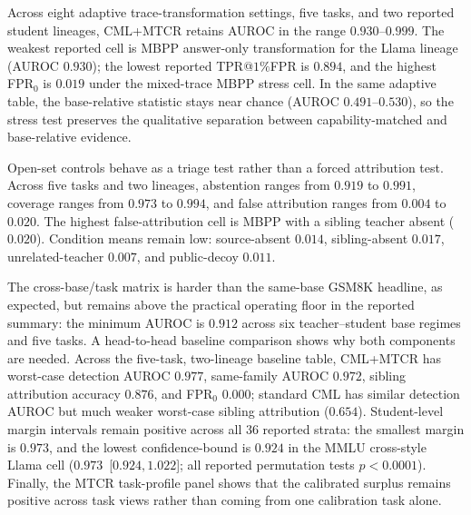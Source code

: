 \documentclass[journal]{IEEEtran}
\begin{document}
Across eight adaptive trace-transformation settings, five tasks, and two reported
student lineages, CML+MTCR retains AUROC in the range $0.930$--$0.999$. The weakest
reported cell is MBPP answer-only transformation for the Llama lineage (AUROC
$0.930$); the lowest reported TPR@$1\%$FPR is $0.894$, and the highest FPR$_0$ is
$0.019$ under the mixed-trace MBPP stress cell. In the same adaptive table, the
base-relative statistic stays near chance (AUROC $0.491$--$0.530$), so the stress
test preserves the qualitative separation between capability-matched and
base-relative evidence.

Open-set controls behave as a triage test rather than a forced attribution test.
Across five tasks and two lineages, abstention ranges from $0.919$ to $0.991$,
coverage ranges from $0.973$ to $0.994$, and false attribution ranges from $0.004$
to $0.020$. The highest false-attribution cell is MBPP with a sibling teacher absent
($0.020$). Condition means remain low: source-absent $0.014$, sibling-absent
$0.017$, unrelated-teacher $0.007$, and public-decoy $0.011$.

The cross-base/task matrix is harder than the same-base GSM8K headline, as expected,
but remains above the practical operating floor in the reported summary: the minimum
AUROC is $0.912$ across six teacher--student base regimes and five tasks. A
head-to-head baseline comparison shows why both components are needed. Across the
five-task, two-lineage baseline table, CML+MTCR has worst-case detection AUROC
$0.977$, same-family AUROC $0.972$, sibling attribution accuracy $0.876$, and
FPR$_0$ $0.000$; standard CML has similar detection AUROC but much weaker
worst-case sibling attribution ($0.654$). Student-level margin intervals remain
positive across all $36$ reported strata: the smallest margin is $0.973$, and the
lowest confidence-bound is $0.924$ in the MMLU cross-style Llama cell
($0.973$~[$0.924,1.022$]; all reported permutation tests $p<0.0001$). Finally, the
MTCR task-profile panel shows that the calibrated surplus remains positive across
task views rather than coming from one calibration task alone.
\end{document}

